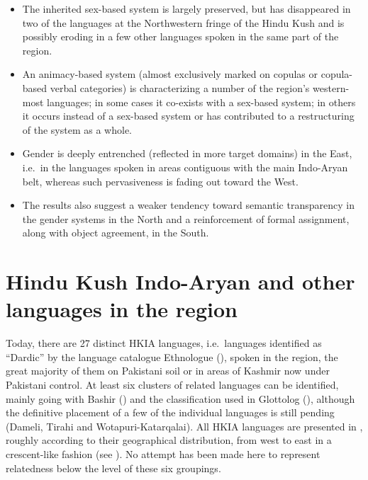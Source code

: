 \documentclass[output=collectionpaper]{langsci/langscibook}
\begin{document}
\begin{itemize}
\item
The inherited sex-based system is largely preserved, but has disappeared in two of the languages at the Northwestern fringe of the Hindu Kush and is possibly eroding in a few other languages spoken in the same part of the region.
\item
An animacy-based system (almost exclusively marked on copulas or copula-based verbal categories) is characterizing a number of the region's western-most languages; in some cases it co-exists with a sex-based system; in others it occurs instead of a sex-based system or has contributed to a restructuring of the system as a whole.
\item
Gender is deeply entrenched (reflected in more target domains) in the East, i.e.\ in the languages spoken in areas contiguous with the main Indo-Aryan belt, whereas such pervasiveness is fading out toward the West.
\item
The results also suggest a weaker tendency toward semantic transparency in the gender systems in the North and a reinforcement of formal assignment, along with object agreement, in the South.
\end{itemize}


\section{Hindu Kush Indo-Aryan and other languages in the region}

Today, there are 27 distinct HKIA languages, i.e.\ languages identified as ``Dardic'' by the language catalogue Ethnologue (\citealt{Lewis2015}), spoken in the region, the great majority of them on Pakistani soil or in areas of Kashmir now under Pakistani control. At least six clusters of related languages can be identified, mainly going with Bashir (\citealt*[824--825]{Bashir2003}) and the classification used in Glottolog (\citealt{Hammarstroem2018}), although the definitive placement of a few of the individual languages is still pending (Dameli, Tirahi and Wotapuri-Katarqalai). All HKIA languages are presented in , roughly according to their geographical distribution, from west to east in a crescent-like fashion (see ). No attempt has been made here to represent relatedness below the level of these six groupings.
\end{document}
